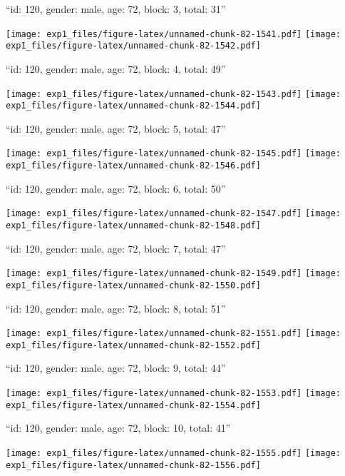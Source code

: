 \documentclass[11pt,,]{article}
\begin{document}
\newpage
[1] 

``id: 120, gender: male, age: 72, block: 3, total: 31''

\texttt{[image: exp1\_files/figure-latex/unnamed-chunk-82-1541.pdf]}
\texttt{[image: exp1\_files/figure-latex/unnamed-chunk-82-1542.pdf]}

\newpage
[1] 

``id: 120, gender: male, age: 72, block: 4, total: 49''

\texttt{[image: exp1\_files/figure-latex/unnamed-chunk-82-1543.pdf]}
\texttt{[image: exp1\_files/figure-latex/unnamed-chunk-82-1544.pdf]}

\newpage
[1] 

``id: 120, gender: male, age: 72, block: 5, total: 47''

\texttt{[image: exp1\_files/figure-latex/unnamed-chunk-82-1545.pdf]}
\texttt{[image: exp1\_files/figure-latex/unnamed-chunk-82-1546.pdf]}

\newpage
[1] 

``id: 120, gender: male, age: 72, block: 6, total: 50''

\texttt{[image: exp1\_files/figure-latex/unnamed-chunk-82-1547.pdf]}
\texttt{[image: exp1\_files/figure-latex/unnamed-chunk-82-1548.pdf]}

\newpage
[1] 

``id: 120, gender: male, age: 72, block: 7, total: 47''

\texttt{[image: exp1\_files/figure-latex/unnamed-chunk-82-1549.pdf]}
\texttt{[image: exp1\_files/figure-latex/unnamed-chunk-82-1550.pdf]}

\newpage
[1] 

``id: 120, gender: male, age: 72, block: 8, total: 51''

\texttt{[image: exp1\_files/figure-latex/unnamed-chunk-82-1551.pdf]}
\texttt{[image: exp1\_files/figure-latex/unnamed-chunk-82-1552.pdf]}

\newpage
[1] 

``id: 120, gender: male, age: 72, block: 9, total: 44''

\texttt{[image: exp1\_files/figure-latex/unnamed-chunk-82-1553.pdf]}
\texttt{[image: exp1\_files/figure-latex/unnamed-chunk-82-1554.pdf]}

\newpage
[1] 

``id: 120, gender: male, age: 72, block: 10, total: 41''

\texttt{[image: exp1\_files/figure-latex/unnamed-chunk-82-1555.pdf]}
\texttt{[image: exp1\_files/figure-latex/unnamed-chunk-82-1556.pdf]}
\end{document}

